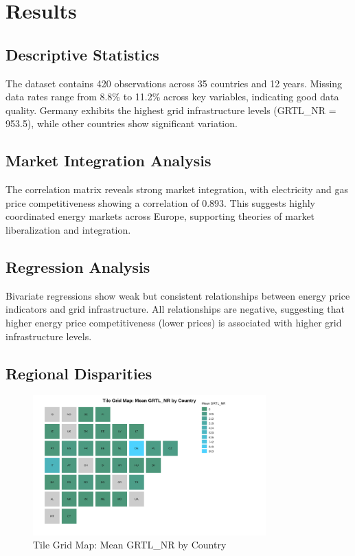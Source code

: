 \documentclass[11pt,a4paper]{article}
\begin{document}
\section{Results}

\subsection{Descriptive Statistics}



The dataset contains 420 observations across 35 countries and 12 years. Missing data rates range from 8.8\% to 11.2\% across key variables, indicating good data quality. Germany exhibits the highest grid infrastructure levels (GRTL\_NR = 953.5), while other countries show significant variation.

\subsection{Market Integration Analysis}



The correlation matrix reveals strong market integration, with electricity and gas price competitiveness showing a correlation of 0.893. This suggests highly coordinated energy markets across Europe, supporting theories of market liberalization and integration.

\subsection{Regression Analysis}



Bivariate regressions show weak but consistent relationships between energy price indicators and grid infrastructure. All relationships are negative, suggesting that higher energy price competitiveness (lower prices) is associated with higher grid infrastructure levels.

\subsection{Regional Disparities}

\begin{figure}[H]
\centering
\includegraphics[width=0.8\textwidth]{assets/fig_tile_grid_map_grtl.svg}
\caption{Tile Grid Map: Mean GRTL\_NR by Country}
\label{fig:grid_map}
\end{figure}
\end{document}
